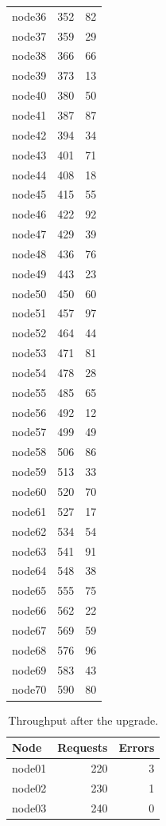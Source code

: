 \documentclass[11pt,letterpaper]{article}
\begin{document}
\begin{longtable}{l r r}
node36 & 352 & 82 \\
node37 & 359 & 29 \\
node38 & 366 & 66 \\
node39 & 373 & 13 \\
node40 & 380 & 50 \\
node41 & 387 & 87 \\
node42 & 394 & 34 \\
node43 & 401 & 71 \\
node44 & 408 & 18 \\
node45 & 415 & 55 \\
node46 & 422 & 92 \\
node47 & 429 & 39 \\
node48 & 436 & 76 \\
node49 & 443 & 23 \\
node50 & 450 & 60 \\
node51 & 457 & 97 \\
node52 & 464 & 44 \\
node53 & 471 & 81 \\
node54 & 478 & 28 \\
node55 & 485 & 65 \\
node56 & 492 & 12 \\
node57 & 499 & 49 \\
node58 & 506 & 86 \\
node59 & 513 & 33 \\
node60 & 520 & 70 \\
node61 & 527 & 17 \\
node62 & 534 & 54 \\
node63 & 541 & 91 \\
node64 & 548 & 38 \\
node65 & 555 & 75 \\
node66 & 562 & 22 \\
node67 & 569 & 59 \\
node68 & 576 & 96 \\
node69 & 583 & 43 \\
node70 & 590 & 80 \\
\end{longtable}

\begin{table}[h]
\centering
\caption{Throughput after the upgrade.}
\begin{tabular}{l r r}
\toprule
Node & Requests & Errors \\
\midrule
node01 & 220 & 3 \\
node02 & 230 & 1 \\
node03 & 240 & 0 \\
\bottomrule
\end{tabular}
\end{table}
\end{document}
